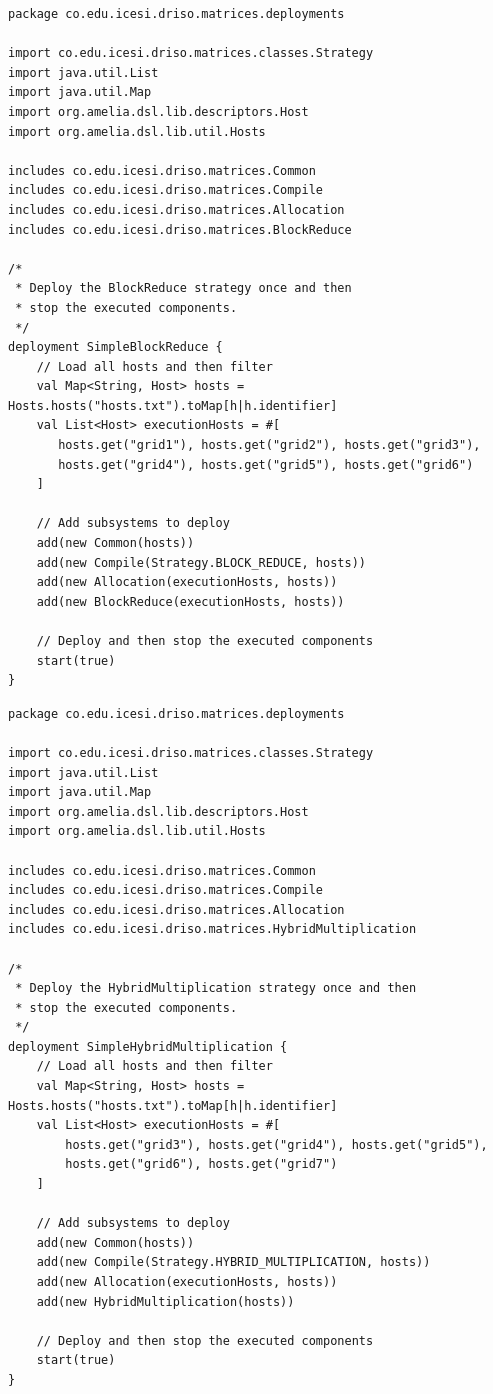 \documentclass{article}
\begin{document}
\begin{lstlisting}[style=amelia,caption=Deployment for BlockReduce]
package co.edu.icesi.driso.matrices.deployments

import co.edu.icesi.driso.matrices.classes.Strategy
import java.util.List
import java.util.Map
import org.amelia.dsl.lib.descriptors.Host
import org.amelia.dsl.lib.util.Hosts

includes co.edu.icesi.driso.matrices.Common
includes co.edu.icesi.driso.matrices.Compile
includes co.edu.icesi.driso.matrices.Allocation
includes co.edu.icesi.driso.matrices.BlockReduce

/*
 * Deploy the BlockReduce strategy once and then
 * stop the executed components.
 */
deployment SimpleBlockReduce {
	// Load all hosts and then filter
	val Map<String, Host> hosts = Hosts.hosts("hosts.txt").toMap[h|h.identifier]
	val List<Host> executionHosts = #[
	   hosts.get("grid1"), hosts.get("grid2"), hosts.get("grid3"),
	   hosts.get("grid4"), hosts.get("grid5"), hosts.get("grid6")
	]

	// Add subsystems to deploy
	add(new Common(hosts))
	add(new Compile(Strategy.BLOCK_REDUCE, hosts))
	add(new Allocation(executionHosts, hosts))
	add(new BlockReduce(executionHosts, hosts))

	// Deploy and then stop the executed components
	start(true)
}
\end{lstlisting}

\begin{lstlisting}[style=amelia,caption=Deployment for Hybrid]
package co.edu.icesi.driso.matrices.deployments

import co.edu.icesi.driso.matrices.classes.Strategy
import java.util.List
import java.util.Map
import org.amelia.dsl.lib.descriptors.Host
import org.amelia.dsl.lib.util.Hosts

includes co.edu.icesi.driso.matrices.Common
includes co.edu.icesi.driso.matrices.Compile
includes co.edu.icesi.driso.matrices.Allocation
includes co.edu.icesi.driso.matrices.HybridMultiplication

/*
 * Deploy the HybridMultiplication strategy once and then
 * stop the executed components.
 */
deployment SimpleHybridMultiplication {	 
    // Load all hosts and then filter
    val Map<String, Host> hosts = Hosts.hosts("hosts.txt").toMap[h|h.identifier]
    val List<Host> executionHosts = #[
        hosts.get("grid3"), hosts.get("grid4"), hosts.get("grid5"),
        hosts.get("grid6"), hosts.get("grid7")
    ]

    // Add subsystems to deploy
    add(new Common(hosts))
    add(new Compile(Strategy.HYBRID_MULTIPLICATION, hosts))
    add(new Allocation(executionHosts, hosts))
    add(new HybridMultiplication(hosts))

    // Deploy and then stop the executed components
    start(true)
}
\end{lstlisting}
\end{document}
